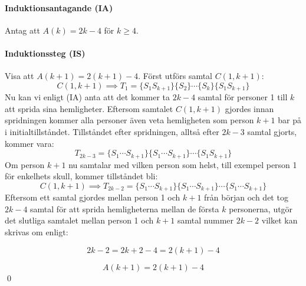 \paragraph{Induktionsantagande (IA)} Antag att $A(k)=2k-4$ för $k\ge4$.

\newpage\paragraph{Induktionssteg (IS)} Visa att $A(k+1)=2(k+1)-4$.\newline\noindent
Först utförs samtal $C(1,k+1)$:
\[C(1,k+1) \implies T_1=\{S_1S_{k+1}\}\{S_2\}\cdots\{S_k\}\{S_1S_{k+1}\}\]
Nu kan vi enligt (IA) anta att det kommer ta $2k-4$ samtal för personer 1 till $k$ att sprida sina hemligheter. Eftersom samtalet $C(1,k+1)$ gjordes innan spridningen kommer alla personer även veta hemligheten som person $k+1$ bar på i initialtillståndet. Tillståndet efter spridningen, alltså efter $2k-3$ samtal gjorts, kommer vara:
\[T_{2k-3}=\{S_1\cdots S_{k+1}\}\{S_1\cdots S_{k+1}\}\cdots\{S_1S_{k+1}\}\]
Om person $k+1$ nu samtalar med vilken person som helst, till exempel person 1 för enkelhets skull, kommer tillståndet bli:
\[C(1,k+1) \implies T_{2k-2}=\{S_1\cdots S_{k+1}\}\{S_1\cdots S_{k+1}\}\cdots\{S_1\cdots S_{k+1}\}\]
Eftersom ett samtal gjordes mellan person 1 och $k+1$ från början och det tog $2k-4$ samtal för att sprida hemligheterna mellan de första $k$ personerna, utgör det slutliga samtalet mellan person 1 och $k+1$ samtal nummer $2k-2$ vilket kan skrivas om enligt:

\[2k-2 = 2k+2-4 = 2(k+1)-4\]

\[A(k+1) = 2(k+1)-4\]
\hfill\qed